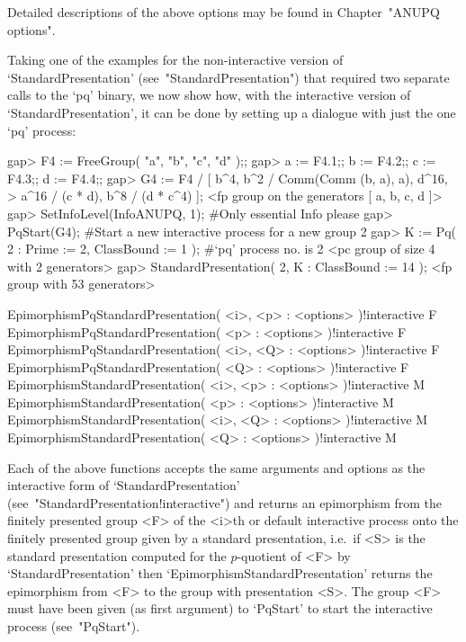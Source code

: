 \endlist

Detailed descriptions of the above options may be found in Chapter~"ANUPQ
options".

Taking  one  of  the  examples  for  the   non-interactive   version   of
`StandardPresentation'  (see~"StandardPresentation")  that  required  two
separate calls to the `pq' binary, we now show how, with the  interactive
version of `StandardPresentation',  it  can  be  done  by  setting  up  a
dialogue with just the one `pq' process:

\beginexample
gap> F4 := FreeGroup( "a", "b", "c", "d" );;
gap> a := F4.1;; b := F4.2;; c := F4.3;; d := F4.4;;
gap> G4 := F4 / [ b^4, b^2 / Comm(Comm (b, a), a), d^16,
>                 a^16 / (c * d), b^8 / (d * c^4) ];
<fp group on the generators [ a, b, c, d ]>
gap> SetInfoLevel(InfoANUPQ, 1); #Only essential Info please
gap> PqStart(G4); #Start a new interactive process for a new group
2
gap> K := Pq( 2 : Prime := 2, ClassBound := 1 ); #`pq' process no. is 2
<pc group of size 4 with 2 generators>
gap> StandardPresentation( 2, K : ClassBound := 14 );
<fp group with 53 generators>
\endexample

\>EpimorphismPqStandardPresentation( <i>, <p> : <options> )!{interactive} F
\>EpimorphismPqStandardPresentation( <p> : <options> )!{interactive} F
\>EpimorphismPqStandardPresentation( <i>, <Q> : <options> )!{interactive} F
\>EpimorphismPqStandardPresentation( <Q> : <options> )!{interactive} F
\>EpimorphismStandardPresentation( <i>, <p> : <options> )!{interactive} M
\>EpimorphismStandardPresentation( <p> : <options> )!{interactive} M
\>EpimorphismStandardPresentation( <i>, <Q> : <options> )!{interactive} M
\>EpimorphismStandardPresentation( <Q> : <options> )!{interactive} M

Each of the above functions accepts the same arguments and options as the
interactive           form           of            `StandardPresentation'
(see~"StandardPresentation!interactive") and returns an epimorphism  from
the finitely presented group <F> of  the  <i>th  or  default  interactive
{\ANUPQ} process onto the finitely presented group given  by  a  standard
presentation, i.e.~if <S> is the standard presentation computed  for  the
$p$-quotient     of     <F>      by      `StandardPresentation'      then
`EpimorphismStandardPresentation' returns the epimorphism from <F> to the
group with presentation <S>. The group <F> must have been given (as first
argument)  to  `PqStart'  to  start  the  interactive  {\ANUPQ}   process
(see~"PqStart").

